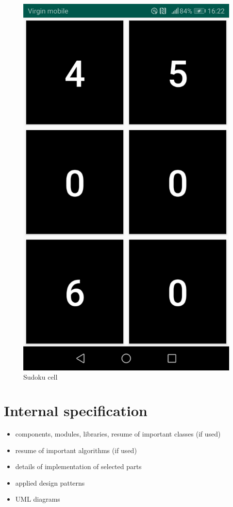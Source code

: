 \documentclass[a4paper,twoside,12pt]{book}
\begin{document}
\begin{figure}[H]
\begin{minipage}{.5\textwidth}
  \includegraphics[width=.8\linewidth]{sudoku cell.jpg}
  \caption{Sudoku cell}
  \label{fig:Sudoku cell}
\end{minipage}
\end{figure}



\chapter{Internal specification}

\iffalse
\begin{itemize}
\item components, modules, libraries, resume of important classes (if used)
\item resume of important algorithms (if used)
\item details of implementation of selected parts
\item applied design patterns
\item UML diagrams
\end{itemize}
\end{document}
